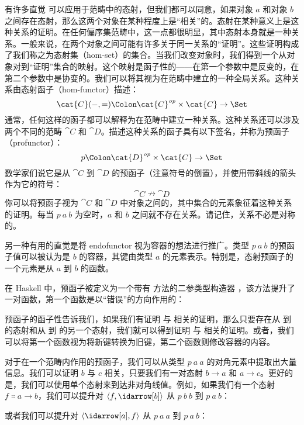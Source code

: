 
\lettrine[lhang=0.17]{有}{许多直觉} 可以应用于范畴中的态射，但我们都可以同意，如果对象 $a$ 和对象 $b$ 之间存在态射，那么这两个对象在某种程度上是“相关”的。态射在某种意义上是这种关系的证明。在任何偏序集范畴中，这一点都很明显，其中态射本身就是一种关系。一般来说，在两个对象之间可能有许多关于同一关系的“证明”。这些证明构成了我们称之为态射集（hom-set）的集合。当我们改变对象时，我们得到一个从对象对到“证明”集合的映射。这个映射是函子性的——在第一个参数中是反变的，在第二个参数中是协变的。我们可以将其视为在范畴中建立的一种全局关系。这种关系由态射函子（hom-functor）描述：
\[\cat{C}(-, =) \Colon \cat{C}^\mathit{op}\times{}\cat{C} \to \Set\]
通常，任何这样的函子都可以解释为在范畴中建立一种关系。这种关系还可以涉及两个不同的范畴 $\cat{C}$ 和 $\cat{D}$。描述这种关系的函子具有以下签名，并称为预函子（profunctor）：
\[p \Colon \cat{D}^\mathit{op}\times{}\cat{C} \to \Set\]
数学家们说它是从 $\cat{C}$ 到 $\cat{D}$ 的预函子（注意符号的倒置），并使用带斜线的箭头作为它的符号：
\[\cat{C} \nrightarrow \cat{D}\]
你可以将预函子视为 $\cat{C}$ 和 $\cat{D}$ 中对象之间的，其中集合的元素象征着这种关系的证明。每当 $p\ a\ b$ 为空时，$a$ 和 $b$ 之间就不存在关系。请记住，关系不必是对称的。

另一种有用的直觉是将 endofunctor 视为容器的想法进行推广。类型 $p\ a\ b$ 的预函子值可以被认为是 $b$ 的容器，其键由类型 $a$ 的元素表示。特别是，态射预函子的一个元素是从 $a$ 到 $b$ 的函数。

在 Haskell 中，预函子被定义为一个带有  方法的二参类型构造器 ，该方法提升了一对函数，第一个函数是以“错误”的方向作用的：

预函子的函子性告诉我们，如果我们有证明  与  相关的证明，那么只要存在从  到  的态射和从  到  的另一个态射，我们就可以得到证明  与  相关的证明。或者，我们可以将第一个函数视为将新键转换为旧键，第二个函数则修改容器的内容。

对于在一个范畴内作用的预函子，我们可以从类型 $p\ a\ a$ 的对角元素中提取出大量信息。我们可以证明 $b$ 与 $c$ 相关，只要我们有一对态射 $b \to a$ 和 $a \to c$。更好的是，我们可以使用单个态射来到达非对角线值。例如，如果我们有一个态射 $f \Colon a \to b$，我们可以提升对 $\langle f, \idarrow[b] \rangle$ 从 $p\ b\ b$ 到 $p\ a\ b$：

或者我们可以提升对 $\langle \idarrow[a], f \rangle$ 从 $p\ a\ a$ 到 $p\ a\ b$：


